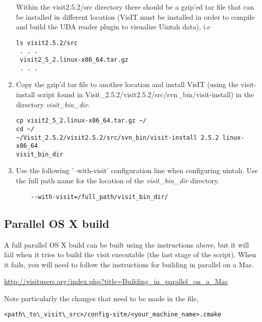 \documentclass[11pt,fleqn]{book} %
\begin{document}
\begin{enumerate}
Within the visit2.5.2/src directory there should be a gzip'ed tar
file that can be installed in different location (VisIT must be
installed in order to compile and build the UDA reader plugin to
visualize Uintah data), i.e

\begin{lstlisting}
ls visit2.5.2/src
 . . . 
 visit2_5_2.linux-x86_64.tar.gz
 . . .
\end{lstlisting}

\item Copy the gzip'd tar file to another location and install VisIT
  (using the visit-install script found in
  Visit\_2.5.2/visit2.5.2/src/svn\_bin/visit-install) in the directory
  \emph{visit\_bin\_dir}.

\begin{lstlisting}
cp visit2_5_2.linux-x86_64.tar.gz ~/
cd ~/
~/Visit_2.5.2/visit2.5.2/src/svn_bin/visit-install 2.5.2 linux-x86_64
visit_bin_dir
\end{lstlisting}

\item Use the following '--with-visit' configuration line when
  configuring uintah. Use the full path name for the location of the
  \emph{visit\_bin\_dir} directory.

\begin{lstlisting}
    --with-visit=/full_path/visit_bin_dir/ 
\end{lstlisting}

\end{enumerate}


\subsection{Parallel OS X build}
\label{sec:ParallelOSXBuild}

A full parallel OS X build can be built using the instructions above,
but it will fail when it tries to build the visit executable (the last
stage of the script). When it fails, you will need to follow the
instructions for building in parallel on a Mac.

\url{http://visitusers.org/index.php?title=Building_in_parallel_on_a_Mac}

  
Note particularly the changes that need to be made in the file, 

\begin{lstlisting}
<path\_to\_visit\_src>/config-site/<your_machine_name>.cmake
\end{lstlisting}
\end{document}
